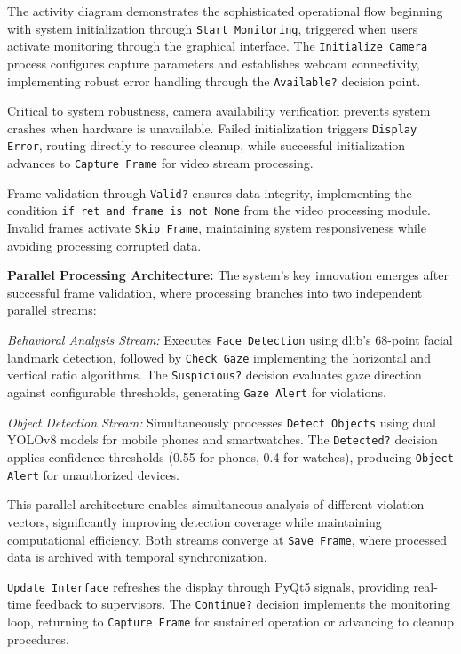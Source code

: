 \documentclass[conference]{IEEEtran}
\begin{document}
The activity diagram demonstrates the sophisticated operational flow beginning with system initialization through \texttt{Start Monitoring}, triggered when users activate monitoring through the graphical interface. The \texttt{Initialize Camera} process configures capture parameters and establishes webcam connectivity, implementing robust error handling through the \texttt{Available?} decision point.

Critical to system robustness, camera availability verification prevents system crashes when hardware is unavailable. Failed initialization triggers \texttt{Display Error}, routing directly to resource cleanup, while successful initialization advances to \texttt{Capture Frame} for video stream processing.

Frame validation through \texttt{Valid?} ensures data integrity, implementing the condition \texttt{if ret and frame is not None} from the video processing module. Invalid frames activate \texttt{Skip Frame}, maintaining system responsiveness while avoiding processing corrupted data.

\textbf{Parallel Processing Architecture:} The system's key innovation emerges after successful frame validation, where processing branches into two independent parallel streams:

\textit{Behavioral Analysis Stream:} Executes \texttt{Face Detection} using dlib's 68-point facial landmark detection, followed by \texttt{Check Gaze} implementing the horizontal and vertical ratio algorithms. The \texttt{Suspicious?} decision evaluates gaze direction against configurable thresholds, generating \texttt{Gaze Alert} for violations.

\textit{Object Detection Stream:} Simultaneously processes \texttt{Detect Objects} using dual YOLOv8 models for mobile phones and smartwatches. The \texttt{Detected?} decision applies confidence thresholds (0.55 for phones, 0.4 for watches), producing \texttt{Object Alert} for unauthorized devices.

This parallel architecture enables simultaneous analysis of different violation vectors, significantly improving detection coverage while maintaining computational efficiency. Both streams converge at \texttt{Save Frame}, where processed data is archived with temporal synchronization.

\texttt{Update Interface} refreshes the display through PyQt5 signals, providing real-time feedback to supervisors. The \texttt{Continue?} decision implements the monitoring loop, returning to \texttt{Capture Frame} for sustained operation or advancing to cleanup procedures.
\end{document}

